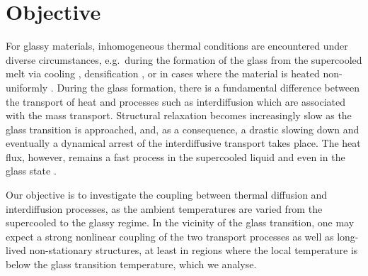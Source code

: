 \section{Objective}

For glassy materials, inhomogeneous thermal conditions are encountered under diverse circumstances, e.g.~during the formation of the glass from the supercooled melt via cooling \cite{angell1986, liu, clever2012, ediger2017}, densification \cite{rauch2002}, or in cases where the material is heated non-uniformly \cite{physicslava, lacks, liu11}.  During the glass formation, there is a fundamental difference between the transport of heat and processes such as interdiffusion which are associated with the mass transport.  Structural relaxation becomes increasingly slow as the glass transition is approached, and, as a consequence, a drastic slowing down and eventually a dynamical arrest of the interdiffusive transport takes place. The heat flux, however, remains a fast process in the supercooled liquid and even in the glass state \cite{mizuno,bhuyan,gotze89,scheidler01}.

Our objective is to investigate the coupling between thermal diffusion and interdiffusion processes, as the ambient temperatures are varied from the supercooled to the glassy regime. In the vicinity of the glass transition, one may expect a strong nonlinear coupling of the two transport processes as well as long-lived non-stationary structures, at least in regions where the local temperature is below the glass transition temperature, which we analyse.



